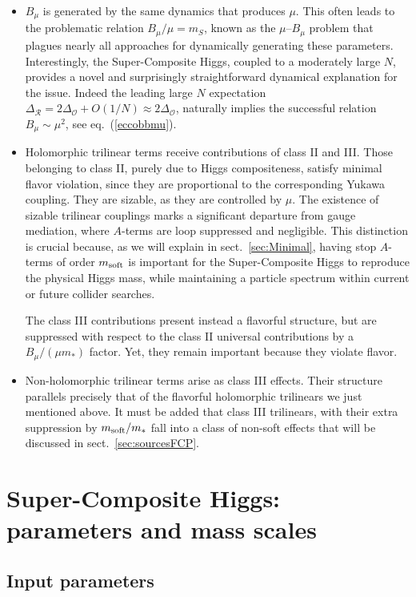 \documentclass[a4paper,12pt]{article}
\def\eq#1{eq.~(\ref{#1})}
\def\eq#1{eq.~(\ref{#1})}
\def\sec#1{sect.~\ref{#1}}
\def\O{\mathcal{O}}
\def\R{\mathcal{R}}
\def\mst{m_*}
\def\mS{m_S}
\def\msoft{m_{\rm soft}}
\begin{document}
\begin{itemize}
\item $B_\mu$ is generated by the same dynamics that produces $\mu$. This often leads to the problematic relation $B_\mu / \mu = \mS$, known as the
 $\mu$--$B_\mu$ problem that plagues nearly all approaches for dynamically generating these parameters. Interestingly, the Super-Composite Higgs, coupled to a moderately large $N$, provides a novel and surprisingly straightforward dynamical explanation for the issue. Indeed the leading large $N$ expectation $\Delta_\R =2 \Delta_\O+O(1/N) \approx 2 \Delta_\O$, naturally implies the successful relation $B_\mu \sim \mu^2$, see \eq{eccobbmu}. 

\item Holomorphic trilinear  terms receive contributions of class II and III. Those belonging to class II, purely due to Higgs compositeness, satisfy minimal flavor violation, since they are proportional to the corresponding Yukawa coupling. They are sizable, as they are controlled by $\mu$. The existence of sizable trilinear couplings marks a significant departure from gauge mediation, where $A$-terms are loop suppressed and negligible. This distinction is crucial because, as we will explain in \sec{sec:Minimal}, having stop $A$-terms of order $\msoft$ is important for the Super-Composite Higgs to reproduce the physical Higgs mass, while maintaining a particle spectrum within current or future collider searches.

The class III contributions present instead a flavorful structure, but are 
suppressed with respect to the class II universal contributions by a $B_\mu/(\mu \mst)$ factor. Yet, they remain important because they violate flavor.

\item Non-holomorphic trilinear  terms arise as class  III effects. Their structure parallels precisely that of the  flavorful  holomorphic trilinears we just mentioned above. 
It must be added that class III  trilinears, with their extra suppression by $\msoft/\mst$ fall into a class of non-soft effects that will be discussed in \sec{sec:sourcesFCP}.

\end{itemize}

\boldmath
\section{Super-Composite Higgs: parameters and mass scales}
\unboldmath
\label{sec:Minimal}

\subsection{Input parameters}
\label{sec:param}
\end{document}
